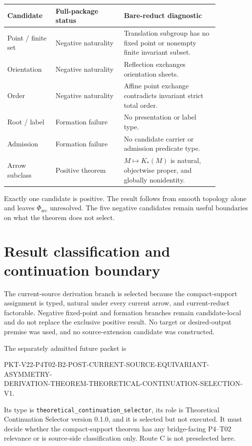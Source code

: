 \documentclass[11pt]{article}
\newcommand{\PhiSrc}{\Phi_{\mathrm{src}}}
\begin{document}
\begin{center}
\small
\begin{tabular}{>{\raggedright\arraybackslash}p{0.19\linewidth}
                >{\raggedright\arraybackslash}p{0.28\linewidth}
                >{\raggedright\arraybackslash}p{0.39\linewidth}}
\toprule
Candidate & Full-package status & Bare-reduct diagnostic \\
\midrule
Point / finite set & Negative naturality & Translation subgroup has no fixed
point or nonempty finite invariant subset. \\
Orientation & Negative naturality & Reflection exchanges orientation sheets. \\
Order & Negative naturality & Affine point exchange contradicts invariant
strict total order. \\
Root / label & Formation failure & No presentation or label type. \\
Admission & Formation failure & No candidate carrier or admission predicate
type. \\
Arrow subclass & Positive theorem & \(M\mapsto K_{*}(M)\)
is natural, objectwise proper, and globally nonidentity. \\
\bottomrule
\end{tabular}
\end{center}

Exactly one candidate is positive.  The result follows from smooth topology
alone and leaves \(\PhiSrc\) unresolved.  The five negative candidates remain
useful boundaries on what the theorem does not select.

\section{Result classification and continuation boundary}

The current-source derivation branch is selected because the compact-support
assignment is typed, natural under every current arrow, and current-reduct
factorable.  Negative fixed-point and formation branches remain candidate-local
and do not replace the exclusive positive result.  No target or desired-output
premise was used, and no source-extension candidate was constructed.

The separately admitted future packet is
\begin{center}
\small\ttfamily
PKT-V22-P4T02-B2-POST-CURRENT-SOURCE-EQUIVARIANT-ASYMMETRY-\\
DERIVATION-THEOREM-THEORETICAL-CONTINUATION-SELECTION-V1.
\end{center}
Its type is \texttt{theoretical\_continuation\_selector}, its role is
Theoretical Continuation Selector version 0.1.0, and it is selected but not
executed.  It must decide whether the compact-support theorem has any
bridge-facing P4--T02 relevance or is source-side classification only.  Route C
is not preselected here.
\end{document}
